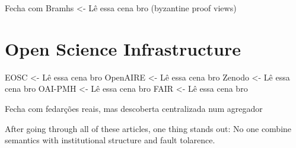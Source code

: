 Fecha com
Bramhs <- Lê essa cena bro (byzantine proof views)


\section{Open Science Infrastructure}
\label{sec:rw:open-science}
EOSC <- Lê essa cena bro
OpenAIRE <- Lê essa cena bro
Zenodo <- Lê essa cena bro
OAI-PMH <- Lê essa cena bro
FAIR <- Lê essa cena bro 

Fecha com
fedarções reais, mas descoberta centralizada num agregador


After going through all of these articles, one thing stands out: No one combine semantics with institutional structure and fault tolarence.
